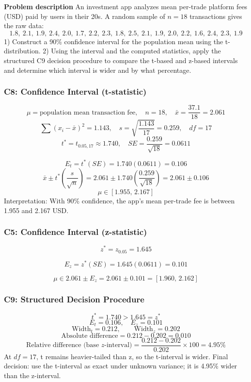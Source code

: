 \begin{ExamProblems}
		\newpage
		\item
		\textbf{Problem description}
		An investment app analyzes mean per-trade platform fees (USD) paid by users in their 20s.
		A random sample of $n=18$ transactions gives the raw data:
		\[
		1.8,\ 2.1,\ 1.9,\ 2.4,\ 2.0,\ 1.7,\ 2.2,\ 2.3,\ 1.8,\ 2.5,\ 2.1,\ 1.9,\ 2.0,\ 2.2,\ 1.6,\ 2.4,\ 2.3,\ 1.9
		\]
		1) Construct a 90\% confidence interval for the population mean using the t-distribution.
		2) Using the interval and the computed statistics, apply the structured C9 decision procedure to compare the t-based and z-based intervals and determine which interval is wider and by what percentage.

		\subsubsection*{C8: Confidence Interval (t-statistic)}
		\[
		\mu=\text{population mean transaction fee},\quad n=18,\quad \bar{x}=\frac{37.1}{18}=2.061
		\]
		\[
		\sum (x_i-\bar{x})^2=1.143,\quad s=\sqrt{\frac{1.143}{17}}=0.259,\quad df=17
		\]
		\[
		t^*=t_{0.05,17}\approx 1.740,\quad SE=\frac{0.259}{\sqrt{18}}=0.0611
		\]

		\[
		E_t=t^*(SE)=1.740(0.0611)=0.106
		\]
		\[
		\bar{x}\pm t^*\left(\frac{s}{\sqrt{n}}\right)=2.061\pm 1.740\left(\frac{0.259}{\sqrt{18}}\right)=2.061\pm 0.106
		\]
		\[
		\mu\in[1.955,\,2.167]
		\]
		Interpretation: With 90\% confidence, the app's mean per-trade fee is between 1.955 and 2.167 USD.

		\subsubsection*{C5: Confidence Interval (z-statistic)}
		\[
		z^*=z_{0.05}=1.645
		\]

		\[
		E_z=z^*(SE)=1.645(0.0611)=0.101
		\]

		\[
		\mu\in 2.061\pm E_z=2.061\pm 0.101=[1.960,\,2.162]
		\]

		\subsubsection*{C9: Structured Decision Procedure}
		\[
		t^*=1.740>1.645=z^*
		\]
		\[
		E_t=0.106,\quad E_z=0.101
		\]
		\[
		\text{Width}_t=0.212,\qquad \text{Width}_z=0.202
		\]
		\[
		\text{Absolute difference}=0.212-0.202=0.010
		\]
		\[
		\text{Relative difference (base }z\text{-interval)}=\frac{0.212-0.202}{0.202}\times 100=4.95\%
		\]
		At $df=17$, t remains heavier-tailed than z, so the t-interval is wider.
		Final decision: use the t-interval as exact under unknown variance; it is 4.95\% wider than the z-interval.


\end{ExamProblems}
